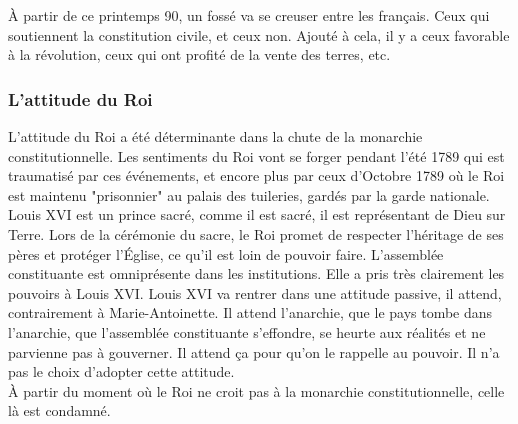 \documentclass[10pt, a4paper, openany]{book}
\begin{document}
À partir de ce printemps 90, un fossé va se creuser entre les français. Ceux qui soutiennent la constitution civile, et ceux non. Ajouté à cela, il y a ceux favorable à la révolution, ceux qui ont profité de la vente des terres, etc. \\

\subsubsection{L'attitude du Roi}

L'attitude du Roi a été déterminante dans la chute de la monarchie constitutionnelle. Les sentiments du Roi vont se forger pendant l'été 1789 qui est traumatisé par ces événements, et encore plus par ceux d'Octobre 1789 où le Roi est maintenu "prisonnier" au palais des tuileries, gardés par la garde nationale. \\
Louis XVI est un prince sacré, comme il est sacré, il est représentant de Dieu sur Terre. Lors de la cérémonie du sacre, le Roi promet de respecter l'héritage de ses pères et protéger l'Église, ce qu'il est loin de pouvoir faire. L'assemblée constituante est omniprésente dans les institutions. Elle a pris très clairement les pouvoirs à Louis XVI. Louis XVI va rentrer dans une attitude passive, il attend, contrairement à Marie-Antoinette. Il attend l'anarchie, que le pays tombe dans l'anarchie, que l'assemblée constituante s'effondre, se heurte aux réalités et ne parvienne pas à gouverner. Il attend ça pour qu'on le rappelle au pouvoir. Il n'a pas le choix d'adopter cette attitude. \\
À partir du moment où le Roi ne croit pas à la monarchie constitutionnelle, celle là est condamné. 
\end{document}
